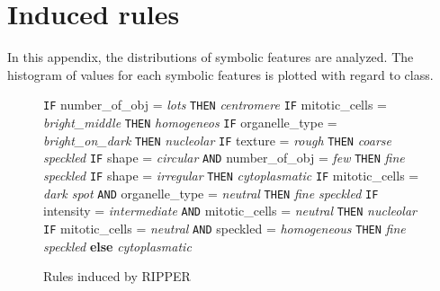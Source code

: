 
\chapter{Induced rules} %

\label{AppendixB} %


In this appendix, the distributions of symbolic features are analyzed. The histogram of values for each symbolic features is plotted with regard to class.



\begin{figure}
	\caption{Rules induced by RIPPER }
	\label{fig:RulesRIPPER}
	\small
	\centering
	
		\begin{algorithmic}[1]
			\State \texttt{IF} number\_of\_obj = \textit{lots} 
			\Statex \texttt{THEN} \textit{centromere}
			\State \texttt{IF} mitotic\_cells = \textit{bright\_middle} 
			\Statex \texttt{THEN} \textit{homogeneos}
			\State \texttt{IF} organelle\_type = \textit{bright\_on\_dark} 
			\Statex \texttt{THEN} \textit{nucleolar}
			\State \texttt{IF} texture = \textit{rough} 
			\Statex \texttt{THEN} \textit{coarse speckled}
			\State \texttt{IF} shape = \textit{circular}  \texttt{AND} number\_of\_obj = \textit{few}
			\Statex \texttt{THEN} \textit{fine speckled}
			\State \texttt{IF} shape = \textit{irregular} 
			\Statex \texttt{THEN} \textit{cytoplasmatic}
			\State \texttt{IF} mitotic\_cells = \textit{dark spot} \texttt{AND} organelle\_type = \textit{neutral} 
			\Statex \texttt{THEN} \textit{fine speckled}
			\State \texttt{IF} intensity = \textit{intermediate} \texttt{AND} mitotic\_cells = \textit{neutral} 
			\Statex \texttt{THEN} \textit{nucleolar}
			\State \texttt{IF} mitotic\_cells = \textit{neutral} \texttt{AND} speckled = \textit{homogeneous} 
			\Statex \texttt{THEN} \textit{fine speckled}
			\State \textbf{else} \textit{cytoplasmatic}
		\end{algorithmic}
	
\end{figure}



